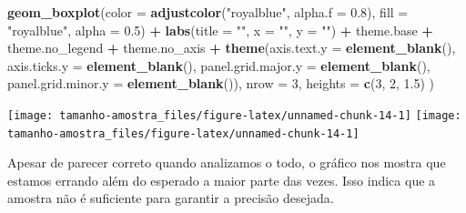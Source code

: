 \documentclass[
]{article}
\newenvironment{Shaded}{\begin{snugshade}}{\end{snugshade}}
\newcommand{\AttributeTok}[1]{\textcolor[rgb]{0.13,0.29,0.53}{#1}}
\newcommand{\DecValTok}[1]{\textcolor[rgb]{0.00,0.00,0.81}{#1}}
\newcommand{\FloatTok}[1]{\textcolor[rgb]{0.00,0.00,0.81}{#1}}
\newcommand{\FunctionTok}[1]{\textcolor[rgb]{0.13,0.29,0.53}{\textbf{#1}}}
\newcommand{\NormalTok}[1]{#1}
\newcommand{\SpecialCharTok}[1]{\textcolor[rgb]{0.81,0.36,0.00}{\textbf{#1}}}
\newcommand{\StringTok}[1]{\textcolor[rgb]{0.31,0.60,0.02}{#1}}
\begin{document}
\begin{Shaded}
\begin{Highlighting}[]
    \FunctionTok{geom\_boxplot}\NormalTok{(}\AttributeTok{color =} \FunctionTok{adjustcolor}\NormalTok{(}\StringTok{"royalblue"}\NormalTok{, }\AttributeTok{alpha.f =} \FloatTok{0.8}\NormalTok{), }\AttributeTok{fill =} \StringTok{"royalblue"}\NormalTok{, }\AttributeTok{alpha =} \FloatTok{0.5}\NormalTok{) }\SpecialCharTok{+}
    \FunctionTok{labs}\NormalTok{(}\AttributeTok{title =} \StringTok{""}\NormalTok{,}
         \AttributeTok{x =} \StringTok{""}\NormalTok{,}
         \AttributeTok{y =} \StringTok{""}\NormalTok{) }\SpecialCharTok{+}
\NormalTok{    theme.base }\SpecialCharTok{+}\NormalTok{ theme.no\_legend }\SpecialCharTok{+}\NormalTok{ theme.no\_axis }\SpecialCharTok{+}
    \FunctionTok{theme}\NormalTok{(}\AttributeTok{axis.text.y =} \FunctionTok{element\_blank}\NormalTok{(),}
          \AttributeTok{axis.ticks.y =} \FunctionTok{element\_blank}\NormalTok{(),}
          \AttributeTok{panel.grid.major.y =} \FunctionTok{element\_blank}\NormalTok{(),}
          \AttributeTok{panel.grid.minor.y =} \FunctionTok{element\_blank}\NormalTok{()),}
  \AttributeTok{nrow =} \DecValTok{3}\NormalTok{,}
  \AttributeTok{heights =} \FunctionTok{c}\NormalTok{(}\DecValTok{3}\NormalTok{, }\DecValTok{2}\NormalTok{, }\FloatTok{1.5}\NormalTok{)}
\NormalTok{)}
\end{Highlighting}
\end{Shaded}

\begin{center}  { \texttt{[image: tamanho-amostra\_files/figure-latex/unnamed-chunk-14-1]} } { \texttt{[image: tamanho-amostra\_files/figure-latex/unnamed-chunk-14-1]} }  \end{center}

Apesar de parecer correto quando analizamos o todo, o gráfico nos mostra
que estamos errando além do esperado a maior parte das vezes. Isso
indica que a amostra não é suficiente para garantir a precisão desejada.
\end{document}
